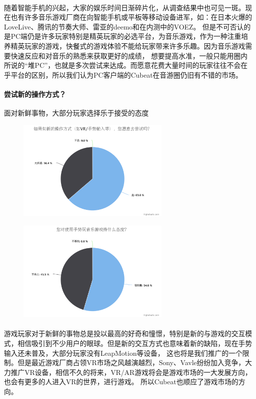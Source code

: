 \documentclass{article} \usepackage{CJK}
\begin{document}
\paragraph{}
随着智能手机的兴起，大家的娱乐时间日渐碎片化，从调查结果中也可见一斑。现在也有许多音乐游戏厂商在向智能手机或平板等移动设备进军，如：在日本火爆的LoveLive、腾讯的节奏大师、雷亚的deemo和在内测中的VOEZ。
但是不可否认的是PC端仍是许多玩家特别是精英玩家的必选平台，为音乐游戏，作为一种注重培养精英玩家的游戏，快餐式的游戏体验不能给玩家带来许多乐趣。因为音乐游戏需要快速反应和对音乐的熟悉来获取更好的成绩，
想要提高水准，一般只能用圈内所说的“堆PC”，也就是多次尝试来达成。而愿意花费大量时间的玩家往往不会在乎平台的区别，所以我们认为PC客户端的Cubeat在音游圈仍旧有不错的市场。
\paragraph{尝试新的操作方式？}
面对新鲜事物，大部分玩家选择乐于接受的态度
\begin{figure}[H]
  \begin{minipage}{0.5\linewidth}
  \includegraphics[width=20em]{chart3.png}\\
  \caption{}\label{2-3}
\end{minipage}
\begin{minipage}{0.5\linewidth}
  \includegraphics[width=20em]{chart4.png}\\
  \caption{}\label{2-4}
\end{minipage}
\end{figure}
\paragraph{}
游戏玩家对于新鲜的事物总是投以最高的好奇和憧憬，特别是新的与游戏的交互模式，相信吸引到不少用户的眼球。但是新的交互方式也意味着新的缺陷，现在手势输入还未普及，大部分玩家没有LeapMotion等设备，
这也将是我们推广的一个限制。但是最近游戏厂商占领VR市场之风越演越烈，Sony、Vavle纷纷加入竞争，大力推广VR设备，相信不久的将来，VR/AR游戏将会是游戏市场的一大发展方向，也会有更多的人进入VR的世界，进行游戏。
所以Cubeat也顺应了游戏市场的方向。
\end{document}
